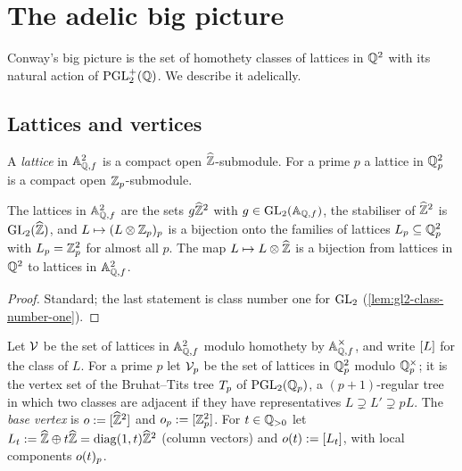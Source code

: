 \section{The adelic big picture}\label{sec:bigpicture}

Conway's big picture \cite{Conway1996} is the set of homothety classes of
lattices in $\mathbb{Q}^{2}$ with its natural action of $\mathrm{PGL}_{2}^{+}(\mathbb{Q})$. We
describe it adelically.

\subsection{Lattices and vertices}

\begin{definition}[Lattices]\label{def:lattices}
A \emph{lattice} in $\mathbb{A}_{\mathbb{Q},f}^{2}$ is a compact open
$\widehat{\mathbb{Z}}$-submodule. For a prime $p$ a lattice in
$\mathbb{Q}_{p}^{2}$ is a compact open
$\mathbb{Z}_{p}$-submodule.
\end{definition}

\begin{lemma}
\label{lem:lattices-translates}
The lattices in $\mathbb{A}_{\mathbb{Q},f}^{2}$ are the sets
$g\widehat{\mathbb{Z}}^{2}$ with $g \in \GL{2}{\FiniteAdeles{\QQ}}$, the
stabiliser of $\widehat{\mathbb{Z}}^{2}$ is
$\GL{2}{\ProfiniteIntegers}$, and $L \mapsto (L\otimes\mathbb{Z}_{p})_p$ is
a bijection onto the families of lattices $L_p \subseteq
\mathbb{Q}_{p}^{2}$ with $L_p = \mathbb{Z}_{p}^{2}$
for almost all $p$. The map $L \mapsto L \otimes \widehat{\mathbb{Z}}$ is a
bijection from lattices in $\mathbb{Q}^{2}$ to lattices in
$\mathbb{A}_{\mathbb{Q},f}^{2}$.
\end{lemma}

\begin{proof}
Standard; the last statement is class number one for $\GL{2}{}$
(\cref{lem:gl2-class-number-one}).
\end{proof}

\begin{definition}\label{def:big-picture-vertices}
Let $\mathcal{V}$ be the set of lattices in
$\mathbb{A}_{\mathbb{Q},f}^{2}$ modulo homothety by
$\mathbb{A}_{\mathbb{Q},f}^{\times}$, and write $[L]$ for the class of $L$.
For a prime $p$ let $\mathcal{V}_{p}$ be the set of lattices in
$\mathbb{Q}_{p}^{2}$ modulo $\mathbb{Q}_{p}^{\times}$; it is the
vertex set of the Bruhat--Tits tree $T_{p}$ of $\PGL{2}{\pAdicNumbers{p}}$,
a $(p+1)$-regular tree in which two classes are adjacent if they have
representatives $L \supsetneq L' \supsetneq pL$. The \emph{base vertex} is
$o := [\widehat{\mathbb{Z}}^{2}]$ and
$o_{p} := [\mathbb{Z}_{p}^{2}]$.
For $t \in \mathbb{Q}_{>0}$ let
$L_{t} := \widehat{\mathbb{Z}} \oplus t\widehat{\mathbb{Z}} =
\mathrm{diag}(1,t)\widehat{\mathbb{Z}}^{2}$ (column vectors) and
$o(t) := [L_{t}]$, with local components
$o(t)_{p}$.
\end{definition}


